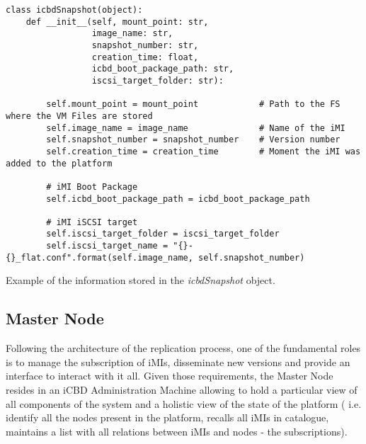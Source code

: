 \begin{listing}[h!]
\begin{verbatim}
class icbdSnapshot(object):
    def __init__(self, mount_point: str,
                 image_name: str,
                 snapshot_number: str,
                 creation_time: float,
                 icbd_boot_package_path: str,
                 iscsi_target_folder: str):

        self.mount_point = mount_point            # Path to the FS where the VM Files are stored
        self.image_name = image_name              # Name of the iMI
        self.snapshot_number = snapshot_number    # Version number
        self.creation_time = creation_time        # Moment the iMI was added to the platform

        # iMI Boot Package
        self.icbd_boot_package_path = icbd_boot_package_path

        # iMI iSCSI target
        self.iscsi_target_folder = iscsi_target_folder
        self.iscsi_target_name = "{}-{}_flat.conf".format(self.image_name, self.snapshot_number)\end{verbatim}
\caption{Example of the information stored in the \textit{icbdSnapshot} object.}
\label{listing:icbdSnapshot_example}
\end{listing}



\subsection{Master Node}
\label{sub:rep_master_node}


Following the architecture of the replication process, one of the fundamental roles is to manage the subscription of iMIs, disseminate new versions and provide an interface to interact with it all. Given those requirements, the Master Node resides in an iCBD Administration Machine allowing to hold a particular view of all components of the system and a holistic view of the state of the platform ( i.e. identify all the nodes present in the platform, recalls all iMIs in catalogue, maintains a list with all relations between iMIs and nodes - the subscriptions). 

